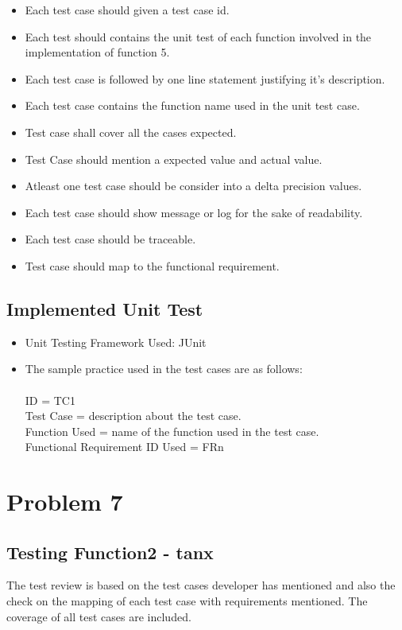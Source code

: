 \documentclass[a4paper,12pt]{article}
\begin{document}
    \begin{itemize}
    \item Each test case should given a test case id.
    \item Each test should contains the unit test of each function involved in the implementation of function 5.
    \item Each test case is followed by one line statement justifying it's description.
    \item Each test case contains the function name used in the unit test case.
    \item Test case shall cover all the cases expected.
    \item Test Case should mention a expected value and actual value.
    \item Atleast one test case should be consider into a delta precision values.
    \item Each test case should show message or log for the sake of readability.
    \item Each test case should be traceable.
    \item Test case should map to the functional requirement.
\end{itemize}

    \subsection{Implemented Unit Test}
\begin{itemize}
    \item  Unit Testing Framework Used: JUnit
    \item The sample practice used in the test cases are as follows:\\
    \\ID = TC1
 \\Test  Case =  description about the test case.
 \\Function Used = name of the function used in the test case.
 \\Functional Requirement ID Used = FRn
\end{itemize}

\section{Problem 7}
    \subsection{Testing Function2 - tanx}
       The test review is based on the test cases developer has mentioned and also the check on the  mapping of each test case with requirements mentioned. The coverage of all test cases are included.
\end{document}
